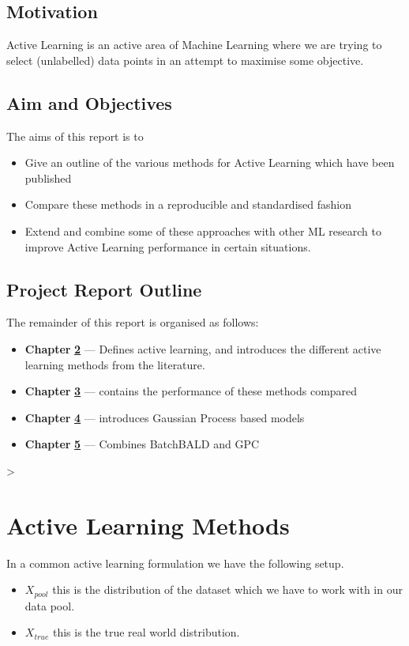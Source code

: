 \documentclass[12pt, a4paper]{report}
\theoremstyle{definition}
\begin{document}
\section{Motivation}

Active Learning is an active area of Machine Learning where we are trying to select (unlabelled) data points in an attempt to maximise some objective.
\section{Aim and Objectives}

The aims of this report is to

\begin{itemize}
    \item Give an outline of the various methods for Active Learning which have been published
    \item Compare these methods in a reproducible and standardised fashion
    \item Extend and combine some of these approaches with other ML research to improve Active Learning performance in certain situations.
\end{itemize}
\section{Project Report Outline}
The remainder of this report is organised as follows:
\begin{itemize}
    \item[] \textbf{Chapter} \hyperref[Chap2]{\textbf{2}} --- Defines active learning, and introduces the different active learning methods from the literature.
    \item[] \textbf{Chapter} \hyperref[Chap3]{\textbf{3}} --- contains the performance of these methods compared
    \item[] \textbf{Chapter} \hyperref[Chap4]{\textbf{4}} --- introduces Gaussian Process based models
    \item[] \textbf{Chapter} \hyperref[Chap5]{\textbf{5}} --- Combines BatchBALD and GPC
\end{itemize}
>

\chapter{Active Learning Methods}
\label{Chap2}

In a common active learning formulation we have the following setup.

\begin{itemize}
    \item $X_{pool}$ this is the distribution of the dataset which we have to work with in our data pool.
    \item $X_{true}$ this is the true real world distribution.
\end{itemize}
\end{document}
